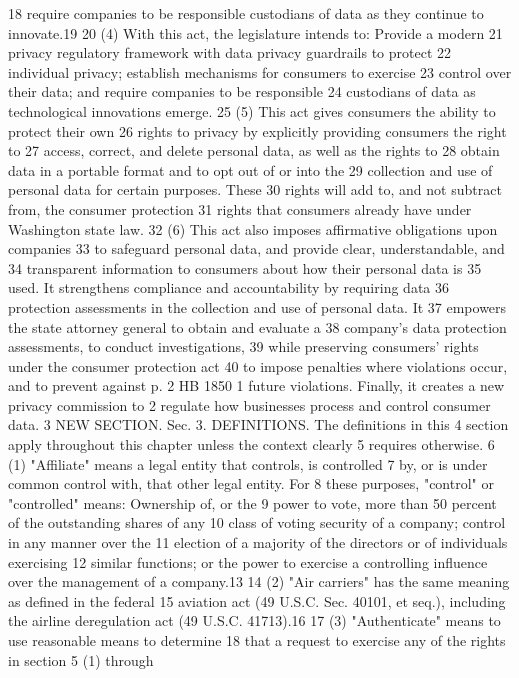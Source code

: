 18 require companies to be responsible custodians of data as they
continue to innovate.19
20 (4) With this act, the legislature intends to: Provide a modern
21 privacy regulatory framework with data privacy guardrails to protect
22 individual privacy; establish mechanisms for consumers to exercise
23 control over their data; and require companies to be responsible
24 custodians of data as technological innovations emerge.
25 (5) This act gives consumers the ability to protect their own
26 rights to privacy by explicitly providing consumers the right to
27 access, correct, and delete personal data, as well as the rights to
28 obtain data in a portable format and to opt out of or into the
29 collection and use of personal data for certain purposes. These
30 rights will add to, and not subtract from, the consumer protection
31 rights that consumers already have under Washington state law.
32 (6) This act also imposes affirmative obligations upon companies
33 to safeguard personal data, and provide clear, understandable, and
34 transparent information to consumers about how their personal data is
35 used. It strengthens compliance and accountability by requiring data
36 protection assessments in the collection and use of personal data. It
37 empowers the state attorney general to obtain and evaluate a
38 company's data protection assessments, to conduct investigations,
39 while preserving consumers' rights under the consumer protection act
40 to impose penalties where violations occur, and to prevent against
p. 2 HB 1850
1 future violations. Finally, it creates a new privacy commission to
2 regulate how businesses process and control consumer data.
3 NEW SECTION. Sec. 3. DEFINITIONS. The definitions in this
4 section apply throughout this chapter unless the context clearly
5 requires otherwise.
6 (1) "Affiliate" means a legal entity that controls, is controlled
7 by, or is under common control with, that other legal entity. For
8 these purposes, "control" or "controlled" means: Ownership of, or the
9 power to vote, more than 50 percent of the outstanding shares of any
10 class of voting security of a company; control in any manner over the
11 election of a majority of the directors or of individuals exercising
12 similar functions; or the power to exercise a controlling influence
over the management of a company.13
14 (2) "Air carriers" has the same meaning as defined in the federal
15 aviation act (49 U.S.C. Sec. 40101, et seq.), including the airline
deregulation act (49 U.S.C. 41713).16
17 (3) "Authenticate" means to use reasonable means to determine
18 that a request to exercise any of the rights in section 5 (1) through

